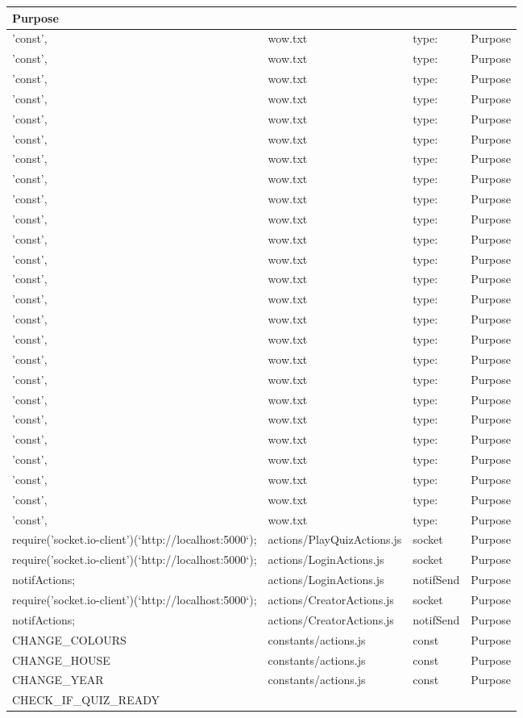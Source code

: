 \begin{table}[]
\begin{tabular}{|l|l|l|l|}
Purpose \\ \hline 'const', & wow.txt & type: & Purpose \\ \hline 'const', & wow.txt & type: & Purpose \\ \hline 'const', & wow.txt & type: & Purpose \\ \hline 'const', & wow.txt & type: & Purpose \\ \hline 'const', & wow.txt & type: & Purpose \\ \hline 'const', & wow.txt & type: & Purpose \\ \hline 'const', & wow.txt & type: & Purpose \\ \hline 'const', & wow.txt & type: & Purpose \\ \hline 'const', & wow.txt & type: & Purpose \\ \hline 'const', & wow.txt & type: & Purpose \\ \hline 'const', & wow.txt & type: & Purpose \\ \hline 'const', & wow.txt & type: & Purpose \\ \hline 'const', & wow.txt & type: & Purpose \\ \hline 'const', & wow.txt & type: & Purpose \\ \hline 'const', & wow.txt & type: & Purpose \\ \hline 'const', & wow.txt & type: & Purpose \\ \hline 'const', & wow.txt & type: & Purpose \\ \hline 'const', & wow.txt & type: & Purpose \\ \hline 'const', & wow.txt & type: & Purpose \\ \hline 'const', & wow.txt & type: & Purpose \\ \hline 'const', & wow.txt & type: & Purpose \\ \hline 'const', & wow.txt & type: & Purpose \\ \hline 'const', & wow.txt & type: & Purpose \\ \hline 'const', & wow.txt & type: & Purpose \\ \hline 'const', & wow.txt & type: & Purpose \\ \hline require('socket.io-client')(`http://localhost:5000`); & actions/PlayQuizActions.js & socket & Purpose \\ \hline require('socket.io-client')(`http://localhost:5000`); & actions/LoginActions.js & socket & Purpose \\ \hline notifActions; & actions/LoginActions.js & notifSend & Purpose \\ \hline require('socket.io-client')(`http://localhost:5000`); & actions/CreatorActions.js & socket & Purpose \\ \hline notifActions; & actions/CreatorActions.js & notifSend & Purpose \\ \hline CHANGE\_COLOURS & constants/actions.js & const & Purpose \\ \hline CHANGE\_HOUSE & constants/actions.js & const & Purpose \\ \hline CHANGE\_YEAR & constants/actions.js & const & Purpose \\ \hline CHECK\_IF\_QUIZ\_READY & 
\end{tabular}
\end{table}
